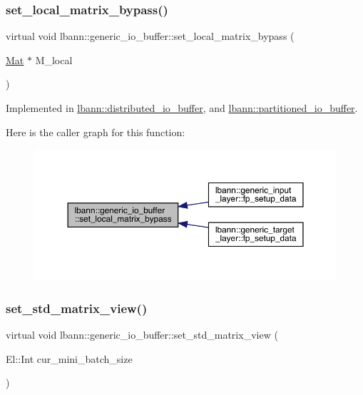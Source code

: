 \subsubsection{\texorpdfstring{set\+\_\+local\+\_\+matrix\+\_\+bypass()}{set\_local\_matrix\_bypass()}}
{\footnotesize\ttfamily virtual void lbann\+::generic\+\_\+io\+\_\+buffer\+::set\+\_\+local\+\_\+matrix\+\_\+bypass (\begin{DoxyParamCaption}\item[{\hyperlink{base_8hpp_a68f11fdc31b62516cb310831bbe54d73}{Mat} $\ast$}]{M\+\_\+local }\end{DoxyParamCaption})\hspace{0.3cm}{\ttfamily [pure virtual]}}



Implemented in \hyperlink{classlbann_1_1distributed__io__buffer_a6bdf8f670edc92902ee6222dde434c39}{lbann\+::distributed\+\_\+io\+\_\+buffer}, and \hyperlink{classlbann_1_1partitioned__io__buffer_a58412c3f37ea3fbcf492f127781c7617}{lbann\+::partitioned\+\_\+io\+\_\+buffer}.

Here is the caller graph for this function\+:\nopagebreak
\begin{figure}[H]
\begin{center}
\leavevmode
\includegraphics[width=350pt]{classlbann_1_1generic__io__buffer_af84c26ab5ee77d1d9ed9ea5d62823815_icgraph}
\end{center}
\end{figure}
\mbox{\label{classlbann_1_1generic__io__buffer_a458d9bf722effce4177a0ac0aee9124f}} 
\subsubsection{\texorpdfstring{set\+\_\+std\+\_\+matrix\+\_\+view()}{set\_std\_matrix\_view()}}
{\footnotesize\ttfamily virtual void lbann\+::generic\+\_\+io\+\_\+buffer\+::set\+\_\+std\+\_\+matrix\+\_\+view (\begin{DoxyParamCaption}\item[{El\+::\+Int}]{cur\+\_\+mini\+\_\+batch\+\_\+size }\end{DoxyParamCaption})\hspace{0.3cm}{\ttfamily [pure virtual]}}



